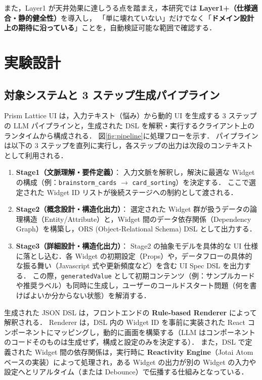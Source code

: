 \documentclass[senior,final,11pt,dvipdfmx]{iputit-thesis}
\begin{document}
また，Layer1 が天井効果に達しうる点を踏まえ，本研究では \textbf{Layer1+（仕様適合・静的健全性）}を導入し，
「単に壊れていない」だけでなく「\textbf{ドメイン設計上の期待に沿っている}」ことを，自動検証可能な範囲で確認する．

\section{実験設計}
\subsection{対象システムと 3 ステップ生成パイプライン}
Prism Lattice UI は，入力テキスト（悩み）から動的 UI を生成する 3 ステップの LLM パイプラインと，生成された DSL を解釈・実行するクライアント上のランタイムから構成される．
図\ref{fig:pipeline}に処理フローを示す．
パイプラインは以下の 3 ステップを直列に実行し，各ステップの出力は次段のコンテキストとして利用される．

\begin{enumerate}
  \item \textbf{Stage1（文脈理解・要件定義）}：
    入力文脈を解釈し，解決に最適な Widget の構成（例：\texttt{brainstorm\_cards} $\to$ \texttt{card\_sorting}）を決定する．
    ここで選定された Widget ID リストが後続ステージへの制約として渡される．
  \item \textbf{Stage2（概念設計・構造化出力）}：
    選定された Widget 群が扱うデータの論理構造（Entity/Attribute）と，Widget 間のデータ依存関係（Dependency Graph）を構築し，ORS (Object-Relational Schema) DSL として出力する．
  \item \textbf{Stage3（詳細設計・構造化出力）}：
    Stage2 の抽象モデルを具体的な UI 仕様に落とし込む．各 Widget の初期設定（Props）や，データフローの具体的な振る舞い（Javascript 式や更新頻度など）を含む UI Spec DSL を出力する．
    この際，\texttt{generatedValue} として初期コンテンツ（例：サンプルカードや推奨ラベル）も同時に生成し，ユーザーのコールドスタート問題（何を書けばよいか分からない状態）を解消する．
\end{enumerate}

生成された JSON DSL は，フロントエンドの \textbf{Rule-based Renderer} によって解釈される．
Renderer は，DSL 内の Widget ID を事前に実装された React コンポーネントにマッピングし，動的に画面を構築する（LLM はコンポーネントのコードそのものは生成せず，構成と設定のみを決定する）．
また，DSL で定義された Widget 間の依存関係は，実行時に \textbf{Reactivity Engine}（Jotai Atom ベースの実装）によって処理され，ある Widget の出力が別の Widget の入力や設定へとリアルタイム（または Debounce）で伝播する仕組みとなっている．
\end{document}

